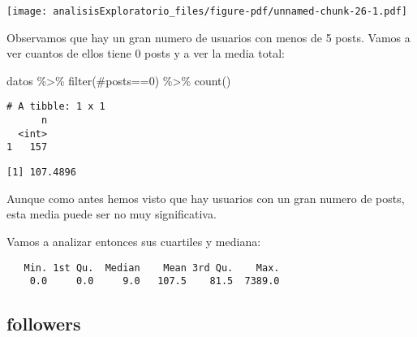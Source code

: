 \documentclass[
  letterpaper,
  DIV=11,
  numbers=noendperiod]{scrreprt}
\newenvironment{Shaded}{\begin{snugshade}}{\end{snugshade}}
\newcommand{\AttributeTok}[1]{\textcolor[rgb]{0.40,0.45,0.13}{#1}}
\newcommand{\DecValTok}[1]{\textcolor[rgb]{0.68,0.00,0.00}{#1}}
\newcommand{\FunctionTok}[1]{\textcolor[rgb]{0.28,0.35,0.67}{#1}}
\newcommand{\NormalTok}[1]{\textcolor[rgb]{0.00,0.23,0.31}{#1}}
\newcommand{\SpecialCharTok}[1]{\textcolor[rgb]{0.37,0.37,0.37}{#1}}
\newcommand{\StringTok}[1]{\textcolor[rgb]{0.13,0.47,0.30}{#1}}
\begin{document}
\texttt{[image: analisisExploratorio\_files/figure-pdf/unnamed-chunk-26-1.pdf]}

Observamos que hay un gran numero de usuarios con menos de 5 posts.
Vamos a ver cuantos de ellos tiene 0 posts y a ver la media total:

\begin{Shaded}
\begin{Highlighting}[]
\NormalTok{datos }\SpecialCharTok{\%\textgreater{}\%} \FunctionTok{filter}\NormalTok{(}\StringTok{\textasciigrave{}}\AttributeTok{\#posts}\StringTok{\textasciigrave{}}\SpecialCharTok{==}\DecValTok{0}\NormalTok{) }\SpecialCharTok{\%\textgreater{}\%} \FunctionTok{count}\NormalTok{()}
\end{Highlighting}
\end{Shaded}

\begin{verbatim}
# A tibble: 1 x 1
      n
  <int>
1   157
\end{verbatim}

\begin{Shaded}
\end{Shaded}

\begin{verbatim}
[1] 107.4896
\end{verbatim}

Aunque como antes hemos visto que hay usuarios con un gran numero de
posts, esta media puede ser no muy significativa.

Vamos a analizar entonces sus cuartiles y mediana:

\begin{Shaded}
\end{Shaded}

\begin{verbatim}
   Min. 1st Qu.  Median    Mean 3rd Qu.    Max. 
    0.0     0.0     9.0   107.5    81.5  7389.0 
\end{verbatim}

\subsection{followers}\label{followers}
\end{document}
